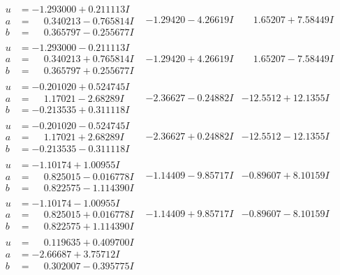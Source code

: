 \documentclass[1p]{elsarticle_modified}
\theoremstyle{definition}
\begin{document}
$$\begin{array}{c|c|c}
\begin{aligned}
u &= -1.293000 + 0.211113 I \\
a &= \phantom{-}0.340213 - 0.765814 I \\
b &= \phantom{-}0.365797 - 0.255677 I\end{aligned}
 & -1.29420 - 4.26619 I & \phantom{-}1.65207 + 7.58449 I \\ \hline\begin{aligned}
u &= -1.293000 - 0.211113 I \\
a &= \phantom{-}0.340213 + 0.765814 I \\
b &= \phantom{-}0.365797 + 0.255677 I\end{aligned}
 & -1.29420 + 4.26619 I & \phantom{-}1.65207 - 7.58449 I \\ \hline\begin{aligned}
u &= -0.201020 + 0.524745 I \\
a &= \phantom{-}1.17021 - 2.68289 I \\
b &= -0.213535 + 0.311118 I\end{aligned}
 & -2.36627 - 0.24882 I & -12.5512 + 12.1355 I \\ \hline\begin{aligned}
u &= -0.201020 - 0.524745 I \\
a &= \phantom{-}1.17021 + 2.68289 I \\
b &= -0.213535 - 0.311118 I\end{aligned}
 & -2.36627 + 0.24882 I & -12.5512 - 12.1355 I \\ \hline\begin{aligned}
u &= -1.10174 + 1.00955 I \\
a &= \phantom{-}0.825015 - 0.016778 I \\
b &= \phantom{-}0.822575 - 1.114390 I\end{aligned}
 & -1.14409 - 9.85717 I & -0.89607 + 8.10159 I \\ \hline\begin{aligned}
u &= -1.10174 - 1.00955 I \\
a &= \phantom{-}0.825015 + 0.016778 I \\
b &= \phantom{-}0.822575 + 1.114390 I\end{aligned}
 & -1.14409 + 9.85717 I & -0.89607 - 8.10159 I \\ \hline\begin{aligned}
u &= \phantom{-}0.119635 + 0.409700 I \\
a &= -2.66687 + 3.75712 I \\
b &= \phantom{-}0.302007 - 0.395775 I\end{aligned}

\end{array}$$
\end{document}
